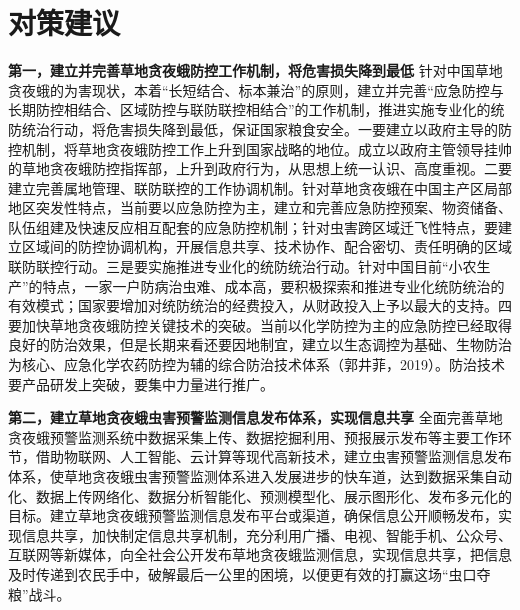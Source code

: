\documentclass{progbookcn}
\begin{document}

\section{对策建议}

\textbf{第一，建立并完善草地贪夜蛾防控工作机制，将危害损失降到最低}
针对中国草地贪夜蛾的为害现状，本着“长短结合、标本兼治”的原则，建立并完善“应急防控与长期防控相结合、区域防控与联防联控相结合”的工作机制，推进实施专业化的统防统治行动，将危害损失降到最低，保证国家粮食安全。一要建立以政府主导的防控机制，将草地贪夜蛾防控工作上升到国家战略的地位。成立以政府主管领导挂帅的草地贪夜蛾防控指挥部，上升到政府行为，从思想上统一认识、高度重视。二要建立完善属地管理、联防联控的工作协调机制。针对草地贪夜蛾在中国主产区局部地区突发性特点，当前要以应急防控为主，建立和完善应急防控预案、物资储备、队伍组建及快速反应相互配套的应急防控机制；针对虫害跨区域迁飞性特点，要建立区域间的防控协调机构，开展信息共享、技术协作、配合密切、责任明确的区域联防联控行动。三是要实施推进专业化的统防统治行动。针对中国目前“小农生产”的特点，一家一户防病治虫难、成本高，要积极探索和推进专业化统防统治的有效模式；国家要增加对统防统治的经费投入，从财政投入上予以最大的支持。四要加快草地贪夜蛾防控关键技术的突破。当前以化学防控为主的应急防控已经取得良好的防治效果，但是长期来看还要因地制宜，建立以生态调控为基础、生物防治为核心、应急化学农药防控为辅的综合防治技术体系（郭井菲，2019）。防治技术要产品研发上突破，要集中力量进行推广。

\textbf{第二，建立草地贪夜蛾虫害预警监测信息发布体系，实现信息共享}
全面完善草地贪夜蛾预警监测系统中数据采集上传、数据挖掘利用、预报展示发布等主要工作环节，借助物联网、人工智能、云计算等现代高新技术，建立虫害预警监测信息发布体系，使草地贪夜蛾虫害预警监测体系进入发展进步的快车道，达到数据采集自动化、数据上传网络化、数据分析智能化、预测模型化、展示图形化、发布多元化的目标。建立草地贪夜蛾预警监测信息发布平台或渠道，确保信息公开顺畅发布，实现信息共享，加快制定信息共享机制，充分利用广播、电视、智能手机、公众号、互联网等新媒体，向全社会公开发布草地贪夜蛾监测信息，实现信息共享，把信息及时传递到农民手中，破解最后一公里的困境，以便更有效的打赢这场“虫口夺粮”战斗。
\end{document}
